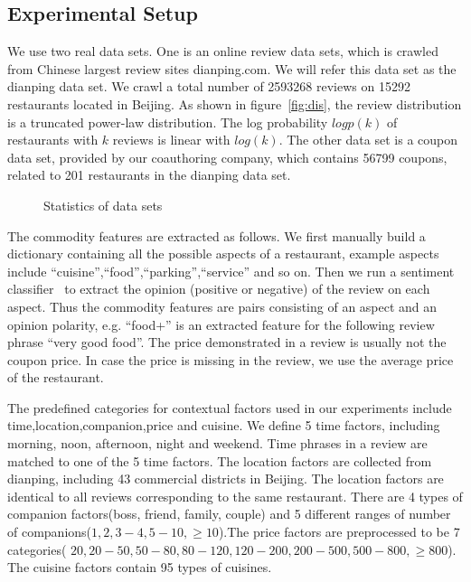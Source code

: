 \documentclass[preprint,12pt]{elsarticle}
\begin{document}
\subsection{Experimental Setup}
We use two real data sets. One is an online review data sets, which is crawled from Chinese largest review sites dianping.com. We will refer this data set as the dianping data set. We crawl a total number of 2593268 reviews on 15292 restaurants located in Beijing. As shown in figure~\ref{fig:dis}, the review distribution is a truncated power-law distribution. The log probability $logp(k)$ of restaurants with $k$ reviews is linear with $log(k)$. The other data set is a coupon data set, provided by our coauthoring company, which contains 56799 coupons, related to 201 restaurants in the dianping data set.
\begin{figure}
\caption{Statistics of data sets}
\end{figure}

The commodity features are extracted as follows. We first manually build a dictionary containing all the possible aspects of a restaurant, example aspects include ``cuisine'',``food'',``parking'',``service'' and so on. Then we run a sentiment classifier~\cite{Liu2005Opinion} to extract the opinion (positive or negative) of the review on each aspect.  Thus the commodity features are pairs consisting of an aspect and an opinion polarity, e.g. ``food+'' is an extracted feature for the following review phrase ``very good food''. The price demonstrated in a review is usually not the coupon price. In case the price is missing in the review, we use the average price of the restaurant.

The predefined categories for contextual factors used in our experiments include time,location,companion,price and cuisine. We define 5 time factors, including morning, noon, afternoon, night and weekend. Time phrases in a review are matched to one of the 5 time factors. The location factors are collected from dianping, including 43 commercial districts in Beijing. The location factors are identical to all reviews corresponding to the same restaurant. There are 4 types of companion factors(boss, friend, family, couple) and 5 different ranges of number of companions($1,2,3-4,5-10,\geq 10$).The price factors are preprocessed to be 7 categories( $20,20-50,50-80,80-120,120-200,200-500,500-800,\geq 800$). The cuisine factors contain 95 types of cuisines.
\end{document}
